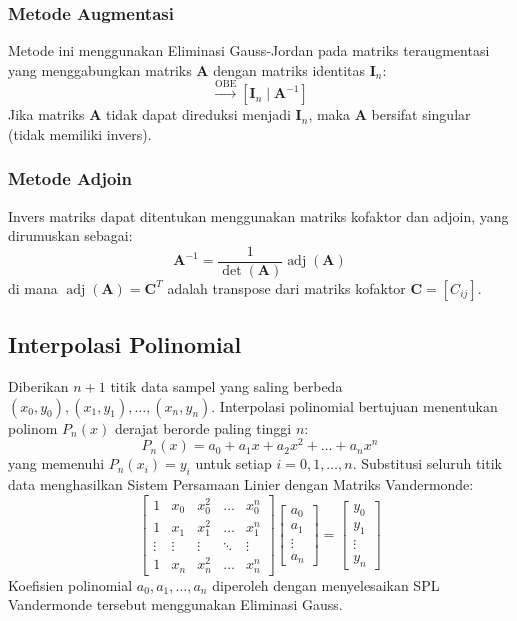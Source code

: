 \documentclass[12pt]{article}
\begin{document}
\begin{enumerate}
\subsubsection{Metode Augmentasi}
Metode ini menggunakan Eliminasi Gauss-Jordan pada matriks teraugmentasi yang menggabungkan matriks $\mathbf{A}$ dengan matriks identitas $\mathbf{I}_n$:
\begin{equation}
    [\mathbf{A} \mid \mathbf{I}_n] \xrightarrow{\text{OBE}} [\mathbf{I}_n \mid \mathbf{A}^{-1}]
\end{equation}
Jika matriks $\mathbf{A}$ tidak dapat direduksi menjadi $\mathbf{I}_n$, maka $\mathbf{A}$ bersifat singular (tidak memiliki invers).

\subsubsection{Metode Adjoin}
Invers matriks dapat ditentukan menggunakan matriks kofaktor dan adjoin, yang dirumuskan sebagai:
\begin{equation}
    \mathbf{A}^{-1} = \frac{1}{\det(\mathbf{A})} \operatorname{adj}(\mathbf{A})
\end{equation}
di mana $\operatorname{adj}(\mathbf{A}) = \mathbf{C}^T$ adalah transpose dari matriks kofaktor $\mathbf{C} = [C_{ij}]$.

\subsection{Interpolasi Polinomial}
Diberikan $n+1$ titik data sampel yang saling berbeda $(x_0, y_0), (x_1, y_1), \dots, (x_n, y_n)$. Interpolasi polinomial bertujuan menentukan polinom $P_n(x)$ derajat berorde paling tinggi $n$:
\begin{equation}
    P_n(x) = a_0 + a_1 x + a_2 x^2 + \dots + a_n x^n
\end{equation}
yang memenuhi $P_n(x_i) = y_i$ untuk setiap $i = 0, 1, \dots, n$. Substitusi seluruh titik data menghasilkan Sistem Persamaan Linier dengan Matriks Vandermonde:
\begin{equation}
    \begin{bmatrix}
        1 & x_0 & x_0^2 & \dots & x_0^n \\
        1 & x_1 & x_1^2 & \dots & x_1^n \\
        \vdots & \vdots & \vdots & \ddots & \vdots \\
        1 & x_n & x_n^2 & \dots & x_n^n
    \end{bmatrix}
    \begin{bmatrix} a_0 \\ a_1 \\ \vdots \\ a_n \end{bmatrix}
    =
    \begin{bmatrix} y_0 \\ y_1 \\ \vdots \\ y_n \end{bmatrix}
\end{equation}
Koefisien polinomial $a_0, a_1, \dots, a_n$ diperoleh dengan menyelesaikan SPL Vandermonde tersebut menggunakan Eliminasi Gauss.


\end{enumerate}
\end{document}
